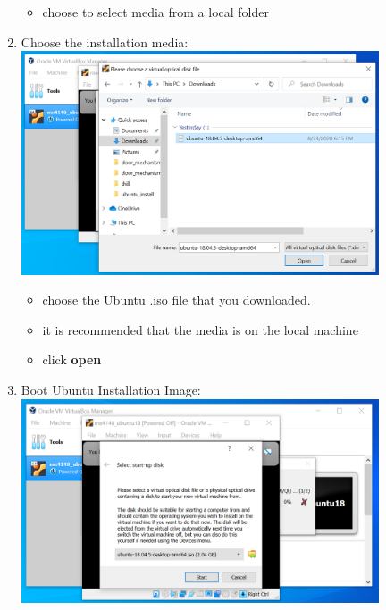 \documentclass[12pt]{article}
\begin{document}
\begin{description}
\begin{description}
\begin{enumerate}[label=\alph*)]
\begin{itemize}
                 \item choose to select media from a local folder 
                 
            \end{itemize}

\newpage	
\item Choose the installation media: \vspace{5mm} \\
      		\hspace*{-2.5cm}\includegraphics[scale=.6]{Capture11.png} \\
               \begin{itemize}
                    
     
                \item choose the Ubuntu .iso file that you downloaded.
                \item it is recommended that the media is on the local machine
                \item click {\bf open}
                
            \end{itemize}
\vspace{10mm}
\item Boot Ubuntu Installation Image: \vspace{5mm} \\
      		\hspace*{-2.5cm}\includegraphics[scale=.6]{Capture12.png}
            \begin{itemize}
                    

\end{itemize}
\end{enumerate}
\end{description}
\end{description}
\end{document}
